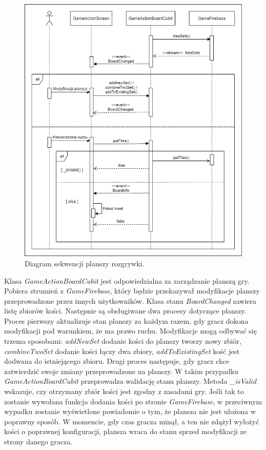 \begin{figure}[h!]
	\begin{center}
		\includegraphics[width=14cm,height=13cm]{img/diagram-sekwencji-board.png}
	\end{center}
	\caption{{\color{dgray}Diagram sekwencji planszy rozgrywki.}} 
	\label{GameActionBoardCubit}
\end{figure} 

Klasa \emph{GameActionBoardCubit} jest odpowiedzialna za zarządzanie planszą gry. Pobiera strumień z \emph{GameFirebase}, który będzie przekazywał modyfikacje planszy przeprowadzone przez innych użytkowników. Klasa stanu \emph{BoardChanged} zawiera listę zbiorów kości. Następnie są obsługiwane dwa procesy dotyczące planszy. Proces pierwszy aktualizuje stan planszy za każdym razem, gdy gracz dokona modyfikacji pod warunkiem, że ma prawo ruchu. Modyfikacje mogą odbywać się trzema sposobami: \emph{addNewSet} dodanie kości do planszy tworzy nowy zbiór, \emph{combineTwoSet} dodanie kości łączy dwa zbiory, \emph{addToExistingSet} kość jest dodwana do istniejącego zbioru. Drugi proces następuje, gdy gracz chce zatwierdzić swoje zmiany przeprowadzone na planszy. W takim przypadku \emph{GameActionBoardCubit} przeprowadza walidację stanu planszy. Metoda \emph{\_isValid} wskazuje, czy otrzymany zbiór kości jest zgodny z zasadami gry. Jeśli tak to zostanie wywołana funkcja dodania kości po stronie \emph{GameFirebase}, w przeciwnym wypadku zostanie wyświetlone powiadomie o tym, że plansza nie jest ułożona w poprawny sposób. W momencie, gdy czas gracza minął, a ten nie zdążył wyłożyć kości o poprawnej konfiguracji, plansza wraca do stanu sprzed modyfikacji ze strony danego gracza. \\ \\ \\ \\ \\ \\

